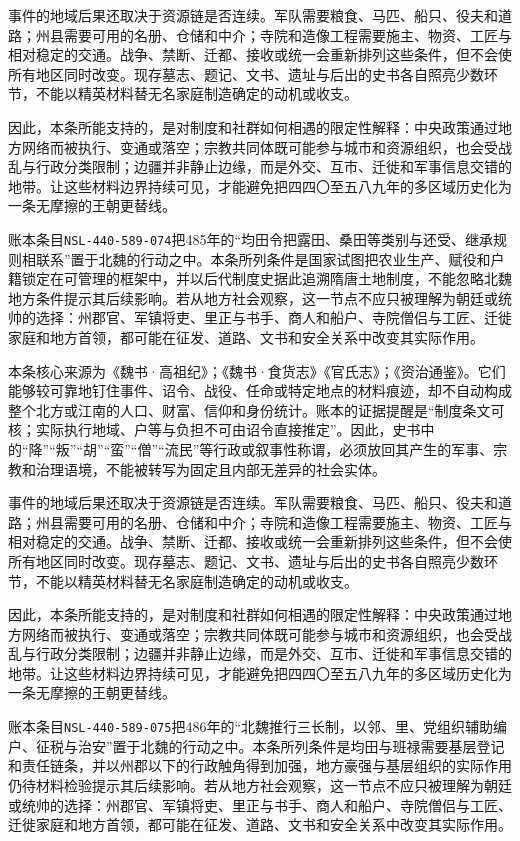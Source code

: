事件的地域后果还取决于资源链是否连续。军队需要粮食、马匹、船只、役夫和道路；州县需要可用的名册、仓储和中介；寺院和造像工程需要施主、物资、工匠与相对稳定的交通。战争、禁断、迁都、接收或统一会重新排列这些条件，但不会使所有地区同时改变。现存墓志、题记、文书、遗址与后出的史书各自照亮少数环节，不能以精英材料替无名家庭制造确定的动机或收支。

因此，本条所能支持的，是对制度和社群如何相遇的限定性解释：中央政策通过地方网络而被执行、变通或落空；宗教共同体既可能参与城市和资源组织，也会受战乱与行政分类限制；边疆并非静止边缘，而是外交、互市、迁徙和军事信息交错的地带。让这些材料边界持续可见，才能避免把四四〇至五八九年的多区域历史化为一条无摩擦的王朝更替线。

账本条目\texttt{NSL-440-589-074}把485年的“均田令把露田、桑田等类别与还受、继承规则相联系”置于北魏的行动之中。本条所列条件是国家试图把农业生产、赋役和户籍锁定在可管理的框架中，并以后代制度史据此追溯隋唐土地制度，不能忽略北魏地方条件提示其后续影响。若从地方社会观察，这一节点不应只被理解为朝廷或统帅的选择：州郡官、军镇将吏、里正与书手、商人和船户、寺院僧侣与工匠、迁徙家庭和地方首领，都可能在征发、道路、文书和安全关系中改变其实际作用。

本条核心来源为《魏书·高祖纪》；《魏书·食货志》《官氏志》；《资治通鉴》。它们能够较可靠地钉住事件、诏令、战役、任命或特定地点的材料痕迹，却不自动构成整个北方或江南的人口、财富、信仰和身份统计。账本的证据提醒是“制度条文可核；实际执行地域、户等与负担不可由诏令直接推定”。因此，史书中的“降”“叛”“胡”“蛮”“僧”“流民”等行政或叙事性称谓，必须放回其产生的军事、宗教和治理语境，不能被转写为固定且内部无差异的社会实体。

事件的地域后果还取决于资源链是否连续。军队需要粮食、马匹、船只、役夫和道路；州县需要可用的名册、仓储和中介；寺院和造像工程需要施主、物资、工匠与相对稳定的交通。战争、禁断、迁都、接收或统一会重新排列这些条件，但不会使所有地区同时改变。现存墓志、题记、文书、遗址与后出的史书各自照亮少数环节，不能以精英材料替无名家庭制造确定的动机或收支。

因此，本条所能支持的，是对制度和社群如何相遇的限定性解释：中央政策通过地方网络而被执行、变通或落空；宗教共同体既可能参与城市和资源组织，也会受战乱与行政分类限制；边疆并非静止边缘，而是外交、互市、迁徙和军事信息交错的地带。让这些材料边界持续可见，才能避免把四四〇至五八九年的多区域历史化为一条无摩擦的王朝更替线。

账本条目\texttt{NSL-440-589-075}把486年的“北魏推行三长制，以邻、里、党组织辅助编户、征税与治安”置于北魏的行动之中。本条所列条件是均田与班禄需要基层登记和责任链条，并以州郡以下的行政触角得到加强，地方豪强与基层组织的实际作用仍待材料检验提示其后续影响。若从地方社会观察，这一节点不应只被理解为朝廷或统帅的选择：州郡官、军镇将吏、里正与书手、商人和船户、寺院僧侣与工匠、迁徙家庭和地方首领，都可能在征发、道路、文书和安全关系中改变其实际作用。


